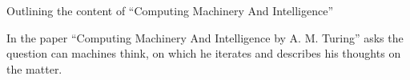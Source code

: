 \documentclass[12pt,a4paper]{article}
\author{Jonas Harlacher}
\begin{document}
{
\begin{center}
\begin{Large}
Outlining the content of ``Computing Machinery And Intelligence''
\end{Large}
\end{center}

In the paper ``Computing Machinery And Intelligence by A. M. Turing'' asks the question can machines think, on which he iterates and describes his thoughts on the matter.

}
\end{document}
